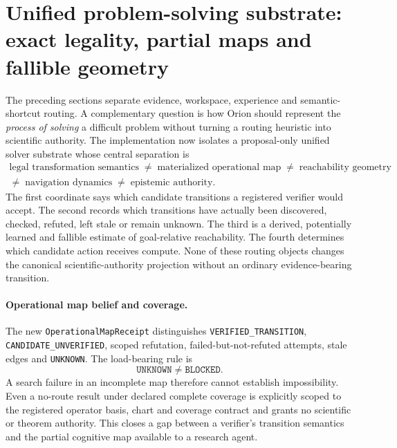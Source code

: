 \section{Unified problem-solving substrate: exact legality, partial maps and fallible geometry}
\label{sec:unified_problem_solving}

The preceding sections separate evidence, workspace, experience and semantic-shortcut routing. A complementary question is how Orion should represent the \emph{process of solving} a difficult problem without turning a routing heuristic into scientific authority. The implementation now isolates a proposal-only unified solver substrate whose central separation is
\begin{gather*}
\text{legal transformation semantics}
\;\neq\;
\text{materialized operational map}
\;\neq\;
\text{reachability geometry}\\
{}\neq\;
\text{navigation dynamics}
\;\neq\;
\text{epistemic authority}.
\end{gather*}
The first coordinate says which candidate transitions a registered verifier would accept. The second records which transitions have actually been discovered, checked, refuted, left stale or remain unknown. The third is a derived, potentially learned and fallible estimate of goal-relative reachability. The fourth determines which candidate action receives compute. None of these routing objects changes the canonical scientific-authority projection without an ordinary evidence-bearing transition.

\paragraph{Operational map belief and coverage.}
The new \texttt{OperationalMapReceipt} distinguishes \texttt{VERIFIED\_TRANSITION}, \texttt{CANDIDATE\_UNVERIFIED}, scoped refutation, failed-but-not-refuted attempts, stale edges and \texttt{UNKNOWN}. The load-bearing rule is
\[
\texttt{UNKNOWN}\neq\texttt{BLOCKED}.
\]
A search failure in an incomplete map therefore cannot establish impossibility. Even a no-route result under declared complete coverage is explicitly scoped to the registered operator basis, chart and coverage contract and grants no scientific or theorem authority. This closes a gap between a verifier's transition semantics and the partial cognitive map available to a research agent.

